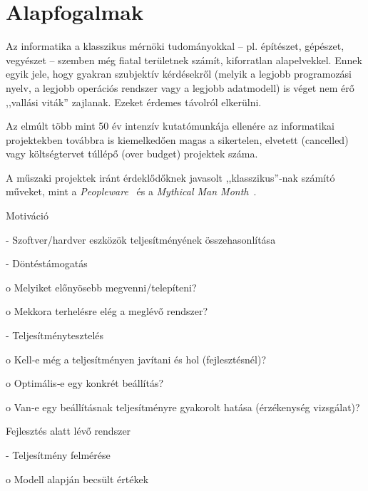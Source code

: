 \label{cha:benchmarking}

\graphicspath{ {./benchmarking/figures/} }


\section{Alapfogalmak}

\begin{megjegyzes}
	Az informatika a klasszikus mérnöki tudományokkal -- pl. építészet, gépészet, vegyészet -- szemben még fiatal területnek számít, kiforratlan alapelvekkel. Ennek egyik jele, hogy gyakran szubjektív kérdésekről (melyik a legjobb programozási nyelv, a legjobb operációs rendszer vagy a legjobb adatmodell) is véget nem érő ,,vallási viták'' zajlanak. Ezeket érdemes távolról elkerülni.
	
	Az elmúlt több mint 50 év intenzív kutatómunkája ellenére az informatikai projektekben továbbra is kiemelkedően magas a sikertelen, elvetett (cancelled) vagy költségtervet túllépő (over budget) projektek száma.
	
	A műszaki projektek iránt érdeklődőknek javasolt ,,klasszikus''-nak számító műveket, mint a \emph{Peopleware}~\cite{demarco2013peopleware} és a \emph{Mythical Man Month}~\cite{brooks1995mythical}.
	
\end{megjegyzes}

Motiváció

- Szoftver/hardver eszközök teljesítményének összehasonlítása

- Döntéstámogatás 

o Melyiket előnyösebb megvenni/telepíteni?

o Mekkora terhelésre elég a meglévő rendszer?

- Teljesítménytesztelés 

o Kell‐e még a teljesítményen javítani és hol 
(fejlesztésnél)?

o Optimális‐e egy konkrét beállítás?

o Van‐e egy beállításnak teljesítményre gyakorolt hatása 
(érzékenység vizsgálat)?

Fejlesztés alatt lévő rendszer

- Teljesítmény felmérése

o Modell alapján becsült értékek

